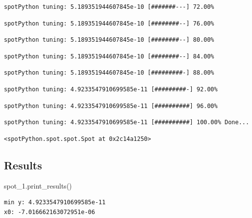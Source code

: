 \documentclass[
  letterpaper,
  DIV=11,
  numbers=noendperiod]{scrreprt}
\newenvironment{Shaded}{\begin{snugshade}}{\end{snugshade}}
\newcommand{\NormalTok}[1]{\textcolor[rgb]{0.00,0.23,0.31}{#1}}
\begin{document}
\begin{verbatim}
spotPython tuning: 5.189351944607845e-10 [#######---] 72.00% 
\end{verbatim}

\begin{verbatim}
spotPython tuning: 5.189351944607845e-10 [########--] 76.00% 
\end{verbatim}

\begin{verbatim}
spotPython tuning: 5.189351944607845e-10 [########--] 80.00% 
\end{verbatim}

\begin{verbatim}
spotPython tuning: 5.189351944607845e-10 [########--] 84.00% 
\end{verbatim}

\begin{verbatim}
spotPython tuning: 5.189351944607845e-10 [#########-] 88.00% 
\end{verbatim}

\begin{verbatim}
spotPython tuning: 4.9233547910699585e-11 [#########-] 92.00% 
\end{verbatim}

\begin{verbatim}
spotPython tuning: 4.9233547910699585e-11 [##########] 96.00% 
\end{verbatim}

\begin{verbatim}
spotPython tuning: 4.9233547910699585e-11 [##########] 100.00% Done...
\end{verbatim}

\begin{verbatim}
<spotPython.spot.spot.Spot at 0x2c14a1250>
\end{verbatim}

\hypertarget{results-3}{%
\subsection{Results}\label{results-3}}

\begin{Shaded}
\begin{Highlighting}[]
\NormalTok{spot\_1.print\_results()}
\end{Highlighting}
\end{Shaded}

\begin{verbatim}
min y: 4.9233547910699585e-11
x0: -7.016662163072951e-06
\end{verbatim}
\end{document}

